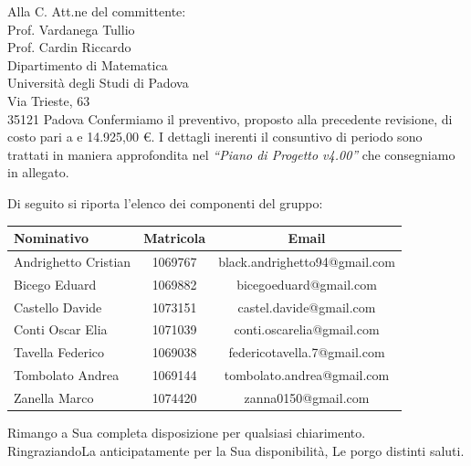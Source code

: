 \documentclass[a4paper,12pt]{letteracdp}
\begin{document}
\begin{letter}{
		Alla C. Att.ne del committente: \\
		Prof. Vardanega Tullio \\
		Prof. Cardin Riccardo \\
		Dipartimento di Matematica \\
		Università degli Studi di Padova \\
		Via Trieste, 63 \\
		35121 Padova}
Confermiamo il preventivo, proposto alla precedente revisione, di costo pari a e 14.925,00 \euro. I dettagli inerenti il consuntivo di periodo sono trattati in maniera approfondita nel \textit{``Piano di Progetto v4.00''} che consegniamo in allegato.

\newpage
Di seguito si riporta l'elenco dei componenti del gruppo:

\begin{center}
		\begin{tabular}{l c c}
			\toprule
			\textbf{Nominativo} & \textbf{Matricola} & \textbf{Email} \\
			\midrule
			Andrighetto Cristian & 1069767 & black.andrighetto94@gmail.com \\
			Bicego Eduard & 1069882 & bicegoeduard@gmail.com  \\
			Castello Davide	& 1073151 &	 castel.davide@gmail.com\\
			Conti Oscar Elia & 1071039 & conti.oscarelia@gmail.com \\
			Tavella Federico & 1069038 & federicotavella.7@gmail.com\\
			Tombolato Andrea & 1069144 & tombolato.andrea@gmail.com	 \\
			Zanella Marco & 1074420 & zanna0150@gmail.com \\
			\bottomrule
		\end{tabular}
\end{center}
		
		\closing{Rimango a Sua completa disposizione per qualsiasi chiarimento. \\
		RingraziandoLa anticipatamente per la Sua disponibilità, Le porgo distinti saluti.}
		
	\end{letter}
\end{document}
